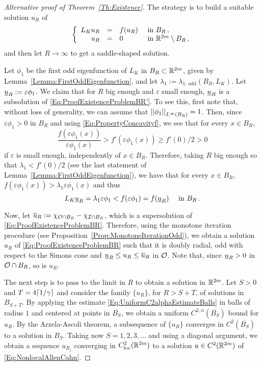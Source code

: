 \begin{proof}[Alternative proof of Theorem~\ref{Th:Existence}]
	The strategy is to build a suitable solution $u_R$ of 
	\begin{equation}
	\label{Eq:ProofExistenceProblemBR}
	\left\{\begin{array}{rcll}
	L_K u_R &=& f(u_R) & \textrm{ in } B_R\,,\\
	u_R &=& 0 & \textrm{ in }\mathbb{R}^{2m} \setminus B_R\,,
	\end{array} \right.
	\end{equation}
	and then let $R\to \infty$ to get a saddle-shaped solution.
	
	Let $\phi_1$ be the first odd eigenfunction of $L_K$ in $B_R \subset \mathbb{R}^{2m}$, given by Lemma~\ref{Lemma:FirstOddEigenfunction}, and let  $\lambda_1 := \lambda_{1, \, \mathrm{odd}}(B_R, L_K)$. Let $\underline{u}_R := \varepsilon \phi_1$. We claim that for $R$ big enough and $\varepsilon$ small enough, $\underline{u}_R$ is a subsolution of \eqref{Eq:ProofExistenceProblemBR'}. To see this, first note that, without loss of generality, we can assume that $\left | \left |{\phi_1} \right | \right |_{L^\infty(B_R)}=1$. Then, since $\varepsilon \phi_1>0$ in $B_R$ and using \eqref{Eq:PropertyConcavityf}, we see that for every $x\in B_R$,
	$$
	\dfrac{f(\varepsilon \phi_1(x))}{\varepsilon \phi_1(x)} > f'(\varepsilon \phi_1(x)) \geq f'(0)/2 > 0
	$$
	if $\varepsilon$ is small enough, independently of $x\in B_R$. Therefore, taking $R$ big enough so that $\lambda_1 < f'(0)/2$ (see the last statement of Lemma~\ref{Lemma:FirstOddEigenfunction}), we have that for every $x\in B_R$,  $f(\varepsilon \phi_1(x)) > \lambda_1 \varepsilon \phi_1(x)$ and thus
	$$
	L_K \underline{u}_R = \lambda_1 \varepsilon \phi_1 < f(\varepsilon \phi_1) = f(\underline{u}_R) \quad \textrm{ in } B_R\,.
	$$
	
	Now, let $\overline{u}_R := \chi_{\mathcal{O} \cap B_R} - \chi_{\mathcal{I} \cap B_R}$, which is a supersolution of \eqref{Eq:ProofExistenceProblemBR}. Therefore, using the monotone iteration procedure (see Proposition~\ref{Prop:MonotoneIterationOdd}), we obtain a solution $u_R$ of \eqref{Eq:ProofExistenceProblemBR} such that it is doubly radial, odd with respect to the Simons cone and $\underline{u}_R \leq u_R \leq \overline{u}_R$ in $\mathcal{O}$. Note that, since $\underline{u}_R > 0$ in $\mathcal{O} \cap B_R$, so is $u_R$.
	
	The next step is to pass to the limit in $R$ to obtain a solution in $\mathbb{R}^{2m}$. Let $S>0$ and $T =4\lceil 1/\gamma\rceil$ and consider the family $\{u_R\}$, for $R> S + T$, of solutions in $B_{S+T}$. By applying the estimate \eqref{Eq:UniformC2alphaEstimateBalls} in balls of radius $1$ and centered at points in $\overline{B_{S}}$, we obtain a uniform $C^{2,\alpha}(\overline{B_S})$ bound for $u_R$. By the Arzela-Ascoli theorem, a subsequence of $\{u_R\}$ converges in $C^2(\overline{B_S})$ to a solution in $B_S$. Taking now $S = 1,2,3,\ldots$ and using a diagonal argument, we obtain a sequence $u_{R_j}$ converging in $C^2_{\mathrm{loc}}(\mathbb{R}^{2m})$ to a solution $u \in C^2(\mathbb{R}^{2m})$ of \eqref{Eq:NonlocalAllenCahn}.
	

\end{proof}
